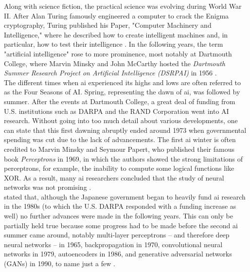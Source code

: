 \documentclass[
  a4paper,  %
  twoside,  %
  bibliography=totoc,
  headsepline,
  cleardoublepage=empty,
  parskip=half,
  draft=false
]{scrbook}
\begin{document}
Along with science fiction, the practical science was evolving during World War II. After Alan Turing famously engineered a computer to crack the Enigma cryptography, Turing published his Paper, "Computer Machinery and Intelligence," where he described how to create intelligent machines and, in particular, how to test their intelligence \cite{turingCOMPUTINGMACHINERYINTELLIGENCE1950}. In the following years, the term "artificial intelligence" rose to more prominence, most notably at Dartmouth College, where Marvin Minsky and John McCarthy hosted the \textit{Dartmouth Summer Research Project on Artificial Intelligence (DSRPAI)} in 1956 \cite{flasinskiHistoryArtificialIntelligence2016}. \\
The different times when \gls{ai} experienced its highs and lows are often referred to as the Four Seasons of AI. Spring, representing the dawn of \gls{ai}, was followed by summer. After the events at Dartmouth College, a great deal of funding from U.S. institutions such as DARPA and the RAND Corporation went into AI research. Without going into too much detail about various developments, one can state that this first dawning abruptly ended around 1973 when governmental spending was cut due to the lack of advancements. The first \gls{ai} winter is often credited to Marvin Minsky and Seymour Papert, who published their famous book \textit{Perceptrons} \cite{minskyPerceptronsIntroductionComputational2017} in 1969, in which the authors showed the strong limitations of perceptrons, for example, the inability to compute some logical functions like XOR. As a result, many \gls{ai} researchers concluded that the study of neural networks was not promising \cite{flasinskiHistoryArtificialIntelligence2016}. \\
 stated that, although the Japanese government began to heavily fund \gls{ai} research in the 1980s (to which the U.S. DARPA responded with a funding increase as well) no further advances were made in the following years. This can only be partially held true because some progress had to be made before the second \gls{ai} summer came around, notably multi-layer perceptrons – and therefore deep neural networks – in 1965, backpropagation in 1970, convolutional neural networks in 1979, autoencoders in 1986, and generative adversarial networks (GANs) in 1990, to name just a few \cite{schmidhuberAnnotatedHistoryModern2022}. \\
\end{document}
